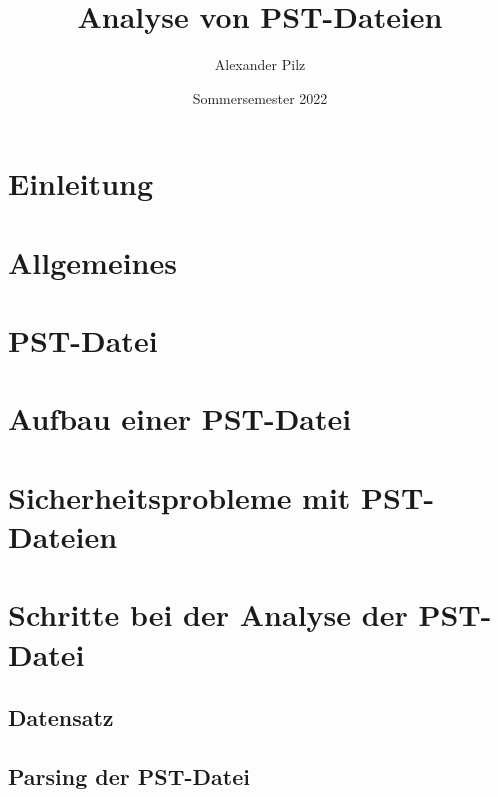 \documentclass[oneside, 11pt, notitlepage, a4paper, numbers=noenddot]{scrartcl}
\title {Analyse von PST-Dateien}
\author{Alexander Pilz}
\date  {Sommersemester 2022}
\begin{document}
\maketitle

\section{Einleitung}

\label{Einleitung}

\section{Allgemeines}

\label{Allgemeines}

\section{PST-Datei}

\label{PST-Datei}

\section{Aufbau einer PST-Datei}

\label{Aufbau einer PST-Datei}

\section{Sicherheitsprobleme mit PST-Dateien}

\label{Sicherheitsprobleme mit PST-Dateien}

\section{Schritte bei der Analyse der PST-Datei}

\label{Schritte bei der Analyse der PST-Datei}

\subsection{Datensatz}

\label{Datensatz}

\subsection{Parsing der PST-Datei}

\label{Parsing der PST-Datei}
\end{document}
